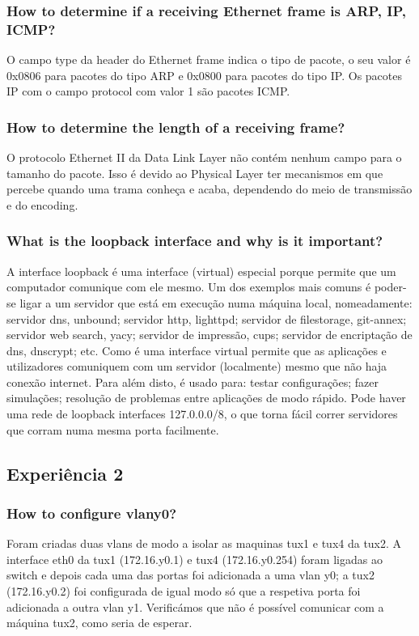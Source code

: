 \documentclass[a4paper]{article}
\begin{document}
\subsubsection{How to determine if a receiving Ethernet frame is ARP, IP, ICMP?}
O campo type da header do Ethernet frame indica o tipo de pacote, o seu valor é 0x0806 para pacotes do tipo ARP e 0x0800 para pacotes do tipo IP. Os pacotes IP com o campo protocol com valor 1 são pacotes ICMP.

\subsubsection{How to determine the length of a receiving frame?}
O protocolo Ethernet II da Data Link Layer não contém nenhum campo para o tamanho do pacote. Isso é devido ao Physical Layer ter mecanismos em que percebe quando uma trama conheça e acaba, dependendo do meio de transmissão e do encoding.

\subsubsection{What is the loopback interface and why is it important?}
A interface loopback é uma interface (virtual) especial porque permite que um computador comunique com ele mesmo. Um dos exemplos mais comuns é poder-se ligar a um servidor que está em execução numa máquina local, nomeadamente: servidor dns, unbound; servidor http, lighttpd; servidor de filestorage, git-annex; servidor web search, yacy; servidor de impressão, cups; servidor  de encriptação de dns, dnscrypt; etc. Como é uma interface virtual permite que as aplicações e utilizadores comuniquem com um servidor (localmente) mesmo que não haja conexão internet. Para além disto, é usado para: testar configurações; fazer simulações; resolução de problemas entre aplicações de modo rápido. Pode haver uma rede de loopback interfaces 127.0.0.0/8, o que torna fácil correr servidores que corram numa mesma porta facilmente.
\subsection{Experiência 2}

\subsubsection{How to configure vlany0?}

Foram criadas duas vlans de modo a isolar as maquinas tux1 e tux4 da tux2. A interface eth0 da tux1 (172.16.y0.1) e tux4 (172.16.y0.254) foram ligadas ao switch e depois cada uma das portas foi adicionada a uma vlan y0; a tux2 (172.16.y0.2) foi configurada de igual modo só que a respetiva porta foi adicionada a outra vlan y1. Verificámos que não é possível comunicar com a máquina tux2, como seria de esperar.
\end{document}
